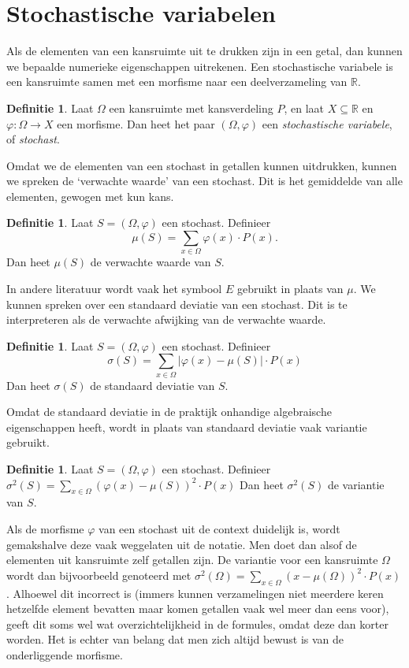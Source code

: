 \documentclass[a4paper]{book}
\theoremstyle{definition}
\newtheorem{definition}[theorem]{Definitie}
\newcommand{\reals}{\mathbb{R}}
\begin{document}
\section{Stochastische variabelen}

Als de elementen van een kansruimte uit te drukken zijn in een getal, dan kunnen we bepaalde numerieke eigenschappen uitrekenen.
Een stochastische variabele is een kansruimte samen met een morfisme naar een deelverzameling van $\reals$.

\begin{definition}
    Laat $\Omega$ een kansruimte met kansverdeling $P$, en laat $X \subseteq \reals$ en $\varphi : \Omega \to X$ een morfisme.
    Dan heet het paar $(\Omega,\varphi)$ een \emph{stochastische variabele}, of \emph{stochast}.
\end{definition}

Omdat we de elementen van een stochast in getallen kunnen uitdrukken, kunnen we spreken de `verwachte waarde' van een stochast.
Dit is het gemiddelde van alle elementen, gewogen met kun kans.

\begin{definition}
    Laat $S = (\Omega,\varphi)$ een stochast.
    Definieer \[ \mu(S) = \sum_{x \in \Omega} \varphi(x) \cdot P(x). \]
    Dan heet $\mu(S)$ de verwachte waarde van $S$.
\end{definition}

In andere literatuur wordt vaak het symbool $E$ gebruikt in plaats van $\mu$.
We kunnen spreken over een standaard deviatie van een stochast. Dit is te interpreteren als de verwachte afwijking van de verwachte waarde.

\begin{definition}
    Laat $S = (\Omega,\varphi)$ een stochast.
    Definieer \[ \sigma(S) = \sum_{x \in \Omega} |\varphi(x) - \mu(S)| \cdot P(x) \]
    Dan heet $\sigma(S)$ de standaard deviatie van $S$.
\end{definition}

Omdat de standaard deviatie in de praktijk onhandige algebraische eigenschappen heeft, wordt in plaats van standaard deviatie vaak variantie gebruikt.

\begin{definition}
    Laat $S = (\Omega,\varphi)$ een stochast.
    Definieer $ \sigma^2(S) = \sum_{x \in \Omega} {(\varphi(x) - \mu(S))}^2 \cdot P(x) $
    Dan heet $\sigma^2(S)$ de variantie van $S$.
\end{definition}

Als de morfisme $\varphi$ van een stochast uit de context duidelijk is, wordt gemakshalve deze vaak weggelaten uit de notatie.
Men doet dan alsof de elementen uit kansruimte zelf getallen zijn.
De variantie voor een kansruimte $\Omega$ wordt dan bijvoorbeeld genoteerd met $ \sigma^2(\Omega) = \sum_{x \in \Omega} {(x - \mu(\Omega))}^2 \cdot P(x) $.
Alhoewel dit incorrect is (immers kunnen verzamelingen niet meerdere keren
hetzelfde element bevatten maar komen getallen vaak wel meer dan eens voor), geeft dit soms wel wat overzichtelijkheid in de formules, omdat deze dan
korter worden. Het is echter van belang dat men zich altijd bewust is van de onderliggende morfisme.
\end{document}
